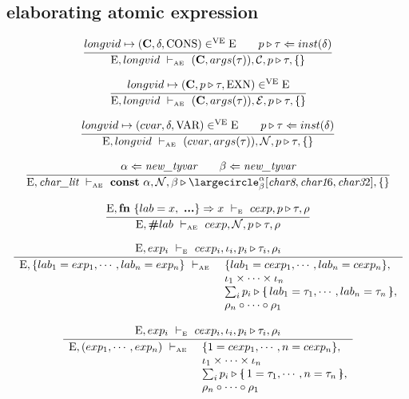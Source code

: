 \documentclass[11pt,a4paper]{article}
\newcommand{\key}[1]{\textrm{\textbf{#1}}}
\newcommand{\record}[1]{\{\!\!\shortmid #1 \shortmid\!\!\}}
\newcommand{\overld}[3]{\largecircle^{#1}_{#2}{#3}}
\newcommand{\qualtype}[2]{#1 \triangleright #2}
\newcommand{\braced}[1]{\{#1\}}
\newcommand{\litchar}{\textit{char\_lit}}
\newcommand{\Char}[1]{\textit{char#1}}
\newcommand{\composeList}[2]{#1 \circ \cdots \circ #2}
\newcommand{\Env}  {\textrm{E}}
\newcommand{\VE}   {\textrm{VE}}
\newcommand{\VKE}  {\textrm{EXN}}
\newcommand{\VKC}  {\textrm{CONS}}
\newcommand{\VKV}  {\textrm{VAR}}
\newcommand{\vcon} {\mathbf{C}}
\newcommand{\Empty}{\braced{}}
\newcommand{\vdashE}  {\ \vdash_{\textrm{\tiny E}}\  }
\newcommand{\vdashAE} {\ \vdash_{\textrm{\tiny AE}}\ }
\newcommand{\xpc}{\mathcal{C}}
\newcommand{\xp} {\mathcal{E}}
\newcommand{\nxp}{\mathcal{N}}
\newcommand{\corenew}[1]{\textit{new\_#1}}
\begin{document}
\subsection {elaborating atomic expression}

\[
\cfrac
 {
  longvid \mapsto (\vcon, \delta, \VKC) \in^\VE \Env \qquad 
  \qualtype{p}{\tau} \Leftarrow inst(\delta) \\
 }
 {\Env, longvid \vdashAE (\vcon, args(\tau)), \xpc, \qualtype{p}{\tau}, \Empty}
\]

\[
\cfrac
 {longvid \mapsto (\vcon, \qualtype{p}{\tau}, \VKE) \in^\VE \Env}
 {\Env, longvid \vdashAE (\vcon, args(\tau)), \xp, \qualtype{p}{\tau}, \Empty}
\]

\[
\cfrac
 {longvid \mapsto (cvar, \delta, \VKV) \in^\VE \Env \qquad
  \qualtype{p}{\tau} \Leftarrow inst(\delta)
  }
 {\Env, longvid \vdashAE (cvar, args(\tau)), \nxp, \qualtype{p}{\tau}, \Empty}
\]

\[
\cfrac
 {\alpha\Leftarrow\corenew{tyvar}        \qquad
  \beta \Leftarrow\corenew{tyvar}        }
 {\Env, \litchar \vdashAE \key{const}\ \alpha, \nxp, \qualtype{\beta}{\overld{\alpha}{\beta}{[\Char8,\Char16,\Char32]}}, \Empty}
\]

\[
\cfrac
 {\Env, \key{fn}\ \braced{lab = x,\ \key{...}} \Rightarrow x \vdashE cexp, \qualtype{p}{\tau},\rho }
 {\Env, \key{\#}lab \vdashAE cexp, \nxp, \qualtype{p}{\tau}, \rho}
\]

\[
\cfrac
 {\Env,exp_i \vdashE cexp_i,\iota_i, \qualtype{p_i}{\tau_i},\rho_i}
 {\begin{array}{ll}
  \Env, \braced{lab_1=exp_1,\cdots,lab_n=exp_n} \vdashAE
    & \braced{lab_1=cexp_1,\cdots,lab_n=cexp_n}, \\
    & \iota_1 \times \cdots \times \iota_n 	     \\
    & \qualtype{\sum_i p_i}{\record{lab_1=\tau_1,\cdots,lab_n=\tau_n}}, \\
    & \composeList{\rho_n}{\rho_1} \\
   \end{array}} 
\]

\[
\cfrac
 {\Env,exp_i \vdashE cexp_i,\iota_i, \qualtype{p_i}{\tau_i},\rho_i}
 {\begin{array}{ll}
  \Env, (exp_1,\cdots,exp_n) \vdashAE
    & \braced{1=cexp_1,\cdots,n=cexp_n}, \\
    & \iota_1 \times \cdots \times \iota_n 	     \\
    & \qualtype{\sum_i p_i}{\record{1=\tau_1,\cdots,n=\tau_n}}, \\
    & \composeList{\rho_n}{\rho_1} \\
   \end{array}} 
\]
\end{document}
